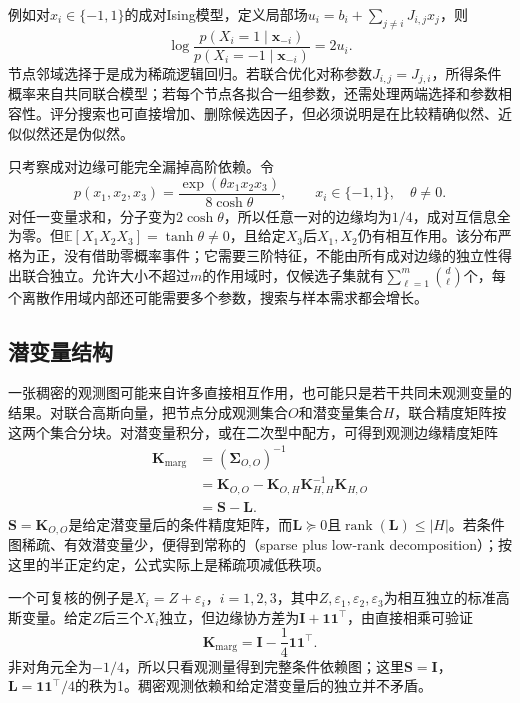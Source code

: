 例如对$x_i\in\{-1,1\}$的成对Ising模型，定义局部场$u_i=b_i+\sum_{j\ne i}J_{i,j}x_j$，则
\[
  \log\frac{p(X_i=1\mid\bm{x}_{-i})}
                {p(X_i=-1\mid\bm{x}_{-i})}=2u_i.
\]
节点邻域选择于是成为稀疏逻辑回归。若联合优化对称参数$J_{i,j}=J_{j,i}$，所得条件概率来自共同联合模型；若每个节点各拟合一组参数，还需处理两端选择和参数相容性。评分搜索也可直接增加、删除候选因子，但必须说明是在比较精确似然、近似似然还是伪似然。

只考察成对边缘可能完全漏掉高阶依赖。令
\[
  p(x_1,x_2,x_3)
  =\frac{\exp(\theta x_1x_2x_3)}{8\cosh\theta},
  \qquad x_i\in\{-1,1\},\quad \theta\ne0.
\]
对任一变量求和，分子变为$2\cosh\theta$，所以任意一对的边缘均为$1/4$，成对互信息全为零。但$\mathbb{E}[X_1X_2X_3]=\tanh\theta\ne0$，且给定$X_3$后$X_1,X_2$仍有相互作用。该分布严格为正，没有借助零概率事件；它需要三阶特征，不能由所有成对边缘的独立性得出联合独立。允许大小不超过$m$的作用域时，仅候选子集就有$\sum_{\ell=1}^{m}\binom d\ell$个，每个离散作用域内部还可能需要多个参数，搜索与样本需求都会增长。

\subsection{潜变量结构}
\label{sec:pgm-structure-learning-latent}

一张稠密的观测图可能来自许多直接相互作用，也可能只是若干共同未观测变量的结果。对联合高斯向量，把节点分成观测集合$O$和潜变量集合$H$，联合精度矩阵按这两个集合分块。对潜变量积分，或在二次型中配方，可得到观测边缘精度矩阵
\begin{equation}
  \begin{aligned}
    \bm{K}_{\mathrm{marg}}
      &=(\bm{\Sigma}_{O,O})^{-1}\\
      &=\bm{K}_{O,O}
        -\bm{K}_{O,H}\bm{K}_{H,H}^{-1}\bm{K}_{H,O}\\
      &=\bm{S}-\bm{L}.
  \end{aligned}
  \label{eq:pgm-structure-learning-schur}
\end{equation}
$\bm{S}=\bm{K}_{O,O}$是给定潜变量后的条件精度矩阵，而$\bm{L}\succeq0$且$\operatorname{rank}(\bm{L})\leq|H|$。若条件图稀疏、有效潜变量少，便得到常称的（sparse plus low-rank decomposition）；按这里的半正定约定，公式实际上是稀疏项减低秩项。

一个可复核的例子是$X_i=Z+\varepsilon_i$，$i=1,2,3$，其中$Z,\varepsilon_1,\varepsilon_2,\varepsilon_3$为相互独立的标准高斯变量。给定$Z$后三个$X_i$独立，但边缘协方差为$\bm{I}+\bm{1}\bm{1}^{\top}$，由直接相乘可验证
\[
  \bm{K}_{\mathrm{marg}}
  =\bm{I}-\frac14\bm{1}\bm{1}^{\top}.
\]
非对角元全为$-1/4$，所以只看观测量得到完整条件依赖图；这里$\bm{S}=\bm{I}$，$\bm{L}=\bm{1}\bm{1}^{\top}/4$的秩为1。稠密观测依赖和给定潜变量后的独立并不矛盾。

